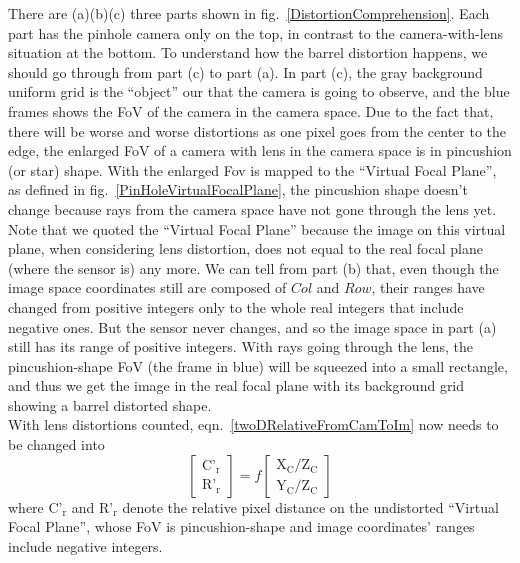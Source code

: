 There are (a)(b)(c) three parts shown in fig.~\ref{DistortionComprehension}. Each part has the pinhole camera only on the top, in contrast to the camera-with-lens situation at the bottom. To understand how the barrel distortion happens, we should go through from part (c) to part (a). In part (c), the gray background uniform grid is the \enquote{object} our that the camera is going to observe, and the blue frames shows the FoV of the camera in the camera space. Due to the fact that, there will be worse and worse distortions as one pixel goes from the center to the edge, the enlarged FoV of a camera with lens in the camera space is in pincushion (or star) shape. With the enlarged Fov is mapped to the \enquote{Virtual Focal Plane}, as defined in fig.~\ref{PinHoleVirtualFocalPlane}, the pincushion shape doesn't change because rays from the camera space have not gone through the lens yet. Note that we quoted the \enquote{Virtual Focal Plane} because the image on this virtual plane, when considering lens distortion, does not equal to the real focal plane (where the sensor is) any more. We can tell from part (b) that, even though the image space coordinates still are composed of \(Col\) and \(Row\), their ranges have changed from positive integers only to the whole real integers that include negative ones. But the sensor never changes, and so the image space in part (a) still has its range of positive integers. With rays going through the lens, the pincushion-shape FoV (the frame in blue) will be squeezed into a small rectangle, and thus we get the image in the real focal plane with its background grid showing a barrel distorted shape.%
\\\indent%
With lens distortions counted, eqn.~\ref{twoDRelativeFromCamToIm} now needs to be changed into 
%
\begin{equation}
\left[ \begin{array}{c} \text{C'}_\text{r} \\ \text{R'}_\text{r} \end{array} \right] %
= f %
\left[ \begin{array}{c} \text{X}_\text{C}/\text{Z}_\text{C} \\ \text{Y}_\text{C}/\text{Z}_\text{C} \end{array} \right]%
\label{undistortedRelativeFromCamToIm}
\end{equation}
where \(\text{C'}_\text{r}\) and \(\text{R'}_\text{r}\) denote the relative pixel distance on the undistorted \enquote{Virtual Focal Plane}, whose FoV is pincushion-shape and image coordinates' ranges include negative integers.%

